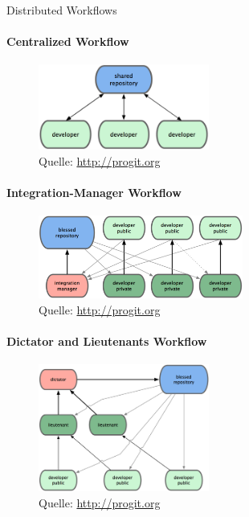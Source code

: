 \begin{frame}[allowframebreaks]{Distributed Workflows}
  \framesubtitle{Centralized Workflow}
  \begin{figure}
    \includegraphics[width=0.5\textwidth]{img/wf-centralized}
    \caption[format=empty]{Quelle: \url{http://progit.org}}
  \end{figure}
  \framebreak
    
  \framesubtitle{Integration-Manager Workflow}
  \begin{figure}
    \includegraphics[width=0.6\textwidth]{img/wf-integration-manager}
    \caption[format=empty]{Quelle: \url{http://progit.org}}
  \end{figure}
  \framebreak

  \framesubtitle{Dictator and Lieutenants Workflow}
  \begin{figure}
   \includegraphics[width=0.5\textwidth]{img/wf-dictator}
    \caption[format=empty]{Quelle: \url{http://progit.org}}
  \end{figure}
\end{frame}

